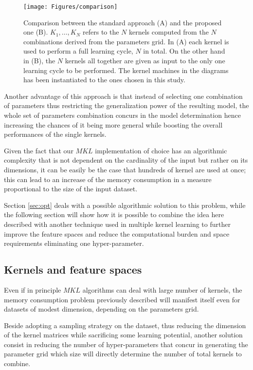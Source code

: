 \begin{figure}[ht]
    \centering
    \texttt{[image: Figures/comparison]}
    \caption{Comparison between the standard approach (A) and the proposed one (B).
    $K_1,\dots,K_N$ refers to the $N$ kernels computed from the $N$ combinations
    derived from the parameters grid. In (A) each kernel is used to perform a full learning
    cycle, $N$ in total. On the other hand in (B), the $N$ kernels all together are
    given as input to the only one learning cycle to be performed. The kernel machines
    in the diagrams has been instantiated to the ones chosen in this study.}
    \label{fig:comparison}
\end{figure}

Another advantage of this approach is that instead of selecting one combination
of parameters thus restricting the generalization power of the resulting model,
the whole set of parameters combination concurs in the model determination hence
increasing the chances of it being more general while boosting the overall performances
of the single kernels.

Given the fact that our $MKL$ implementation of choice has an algorithmic
complexity that is not dependent on the cardinality of the input but rather on
its dimensions, it can be easily be the case that hundreds of kernel are used
at once; this can lead to an increase of the memory consumption in a measure
proportional to the size of the input dataset.

Section \ref{sec:opt} deals with a possible algorithmic solution to this problem,
while the following section will show how it is possible to combine the idea here
described with another technique used in multiple kernel learning to further
improve the feature spaces and reduce the computational burden and space
requirements eliminating one hyper-parameter.

\subsection{Kernels and feature spaces}
\label{subsec:features}

Even if in principle $MKL$ algorithms can deal with large number of kernels, the
memory consumption problem previously described will manifest itself even for
datasets of modest dimension, depending on the parameters grid.

Beside adopting a sampling strategy on the dataset, thus reducing the dimension
of the kernel matrices while sacrificing some learning potential, another
solution consist in reducing the number of hyper-parameters that concur
in generating the parameter grid which size will directly determine the number
of total kernels to combine.


